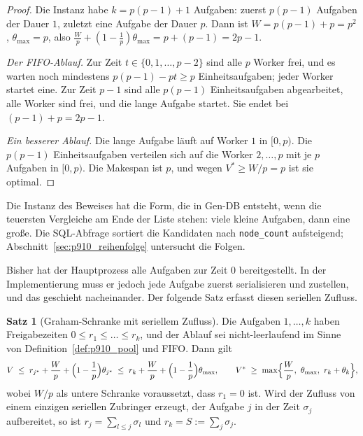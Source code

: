 \documentclass[a4paper,12pt, twoside]{report}
\theoremstyle{definition}
\newtheorem{satz}{Satz}
\begin{document}
\begin{proof}
Die Instanz habe $k=p(p-1)+1$ Aufgaben: zuerst $p(p-1)$ Aufgaben der Dauer $1$, zuletzt eine Aufgabe der Dauer $p$. Dann ist $W=p(p-1)+p=p^2$, $\theta_{\max}=p$, also $\frac Wp+(1-\frac1p)\theta_{\max}=p+(p-1)=2p-1$.

\emph{Der FIFO-Ablauf.} Zur Zeit $t\in\{0,1,\dots,p-2\}$ sind alle $p$ Worker frei, und es warten noch mindestens $p(p-1)-pt\ge p$ Einheitsaufgaben; jeder Worker startet eine. Zur Zeit $p-1$ sind alle $p(p-1)$ Einheitsaufgaben abgearbeitet, alle Worker sind frei, und die lange Aufgabe startet. Sie endet bei $(p-1)+p=2p-1$.

\emph{Ein besserer Ablauf.} Die lange Aufgabe läuft auf Worker $1$ in $[0,p)$. Die $p(p-1)$ Einheitsaufgaben verteilen sich auf die Worker $2,\dots,p$ mit je $p$ Aufgaben in $[0,p)$. Die Makespan ist $p$, und wegen $V^\ast\ge W/p=p$ ist sie optimal.
\end{proof}

Die Instanz des Beweises hat die Form, die in Gen-DB entsteht, wenn die teuersten Vergleiche am Ende der Liste stehen: viele kleine Aufgaben, dann eine große. Die SQL-Abfrage sortiert die Kandidaten nach \texttt{node\_count} aufsteigend; Abschnitt~\ref{sec:p910_reihenfolge} untersucht die Folgen.

Bisher hat der Hauptprozess alle Aufgaben zur Zeit $0$ bereitgestellt. In der Implementierung muss er jedoch jede Aufgabe zuerst serialisieren und zustellen, und das geschieht nacheinander. Der folgende Satz erfasst diesen seriellen Zufluss.

\begin{satz}[Graham-Schranke mit seriellem Zufluss]
\label{satz:p910_freigabe}
Die Aufgaben $1,\dots,k$ haben Freigabezeiten $0\le r_1\le\dots\le r_k$, und der Ablauf sei nicht-leerlaufend im Sinne von Definition~\ref{def:p910_pool} und FIFO. Dann gilt
\[
V\;\le\;r_{j^\ast}+\frac Wp+\Bigl(1-\frac1p\Bigr)\theta_{j^\ast}\;\le\;r_k+\frac Wp+\Bigl(1-\frac1p\Bigr)\theta_{\max},
\qquad
V^\ast\;\ge\;\max\Bigl\{\frac Wp,\ \theta_{\max},\ r_k+\theta_k\Bigr\},
\]
wobei $W/p$ als untere Schranke voraussetzt, dass $r_1=0$ ist. Wird der Zufluss von einem einzigen seriellen Zubringer erzeugt, der Aufgabe $j$ in der Zeit $\sigma_j$ aufbereitet, so ist $r_j=\sum_{l\le j}\sigma_l$ und $r_k=S:=\sum_j\sigma_j$.
\end{satz}
\end{document}
